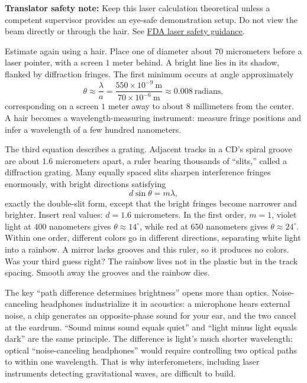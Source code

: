 \begin{mainline}
\textbf{Translator safety note:} Keep this laser calculation theoretical unless a competent supervisor provides an eye-safe demonstration setup. Do not view the beam directly or through the hair. See \href{https://www.fda.gov/consumers/consumer-updates/laser-toys-how-keep-kids-safe}{FDA laser safety guidance}.

Estimate again using a hair. Place one of diameter about \(70\) micrometers before a laser pointer, with a screen \(1\) meter behind. A bright line lies in its shadow, flanked by diffraction fringes. The first minimum occurs at angle approximately
\[
  \theta \approx \frac{\lambda}{a} = \frac{550\times10^{-9}\ \text{m}}{70\times10^{-6}\ \text{m}}
  \approx 0.008\ \text{radians},
\]
corresponding on a screen \(1\) meter away to about \(8\) millimeters from the center. A hair becomes a wavelength-measuring instrument: measure fringe positions and infer a wavelength of a few hundred nanometers.

The third equation describes a grating. Adjacent tracks in a CD's spiral groove are about \(1.6\) micrometers apart, a ruler bearing thousands of ``slits,'' called a diffraction grating. Many equally spaced slits sharpen interference fringes enormously, with bright directions satisfying
\[
  d\sin\theta = m\lambda ,
\]
exactly the double-slit form, except that the bright fringes become narrower and brighter. Insert real values: \(d=1.6\) micrometers. In the first order, \(m=1\), violet light at \(400\) nanometers gives \(\theta\approx 14^\circ\), while red at \(650\) nanometers gives \(\theta\approx 24^\circ\). Within one order, different colors go in different directions, separating white light into a rainbow. A mirror lacks grooves and this ruler, so it produces no colors. Was your third guess right? The rainbow lives not in the plastic but in the track spacing. Smooth away the grooves and the rainbow dies.

The key ``path difference determines brightness'' opens more than optics. Noise-canceling headphones industrialize it in acoustics: a microphone hears external noise, a chip generates an opposite-phase sound for your ear, and the two cancel at the eardrum. ``Sound minus sound equals quiet'' and ``light minus light equals dark'' are the same principle. The difference is light's much shorter wavelength: optical ``noise-canceling headphones'' would require controlling two optical paths to within one wavelength. That is why interferometers, including laser instruments detecting gravitational waves, are difficult to build.
\end{mainline}


